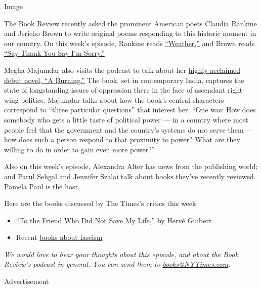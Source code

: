 Image

The Book Review recently asked the prominent American poets Claudia
Rankine and Jericho Brown to write original poems responding to this
historic moment in our country. On this week's episode, Rankine reads
\href{https://www.nytimes3xbfgragh.onion/2020/06/15/books/review/claudia-rankine-weather-poem-coronavirus.html}{``Weather,''}
and Brown reads
\href{https://www.nytimes3xbfgragh.onion/2020/06/15/books/review/jericho-brown-say-thank-you-say-im-sorry-poem-coronavirus.html}{``Say
Thank You Say I'm Sorry.''}

Megha Majumdar also visits the podcast to talk about her
\href{https://www.nytimes3xbfgragh.onion/2020/06/08/books/review/a-burning-megha-majumdar.html}{highly
acclaimed debut novel, ``A Burning.''} The book, set in contemporary
India, captures the state of longstanding issues of oppression there in
the face of ascendant right-wing politics. Majumdar talks about how the
book's central characters correspond to ``three particular questions''
that interest her. ``One was: How does somebody who gets a little taste
of political power --- in a country where most people feel that the
government and the country's systems do not serve them --- how does such
a person respond to that proximity to power? What are they willing to do
in order to gain even more power?''

Also on this week's episode, Alexandra Alter has news from the
publishing world; and Parul Sehgal and Jennifer Szalai talk about books
they've recently reviewed. Pamela Paul is the host.

Here are the books discussed by The Times's critics this week:

\begin{itemize}
\item
  \href{https://www.nytimes3xbfgragh.onion/2020/06/08/books/review-herve-guibert-to-friend-who-did-not-save-my-life-written-in-invisible-ink.html}{``To
  the Friend Who Did Not Save My Life,''} by Hervé Guibert
\item
  Recent
  \href{https://www.nytimes3xbfgragh.onion/2020/06/10/books/fascism-debate-donald-trump.html}{books
  about fascism}
\end{itemize}

\emph{We would love to hear your thoughts about this episode, and about
the Book Review's podcast in general. You can send them to}
\href{mailto:books@NYTimes.com}{\emph{books@NYTimes.com}}\emph{.}

Advertisement

